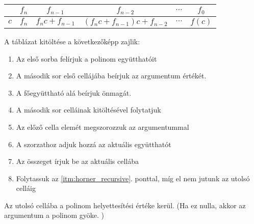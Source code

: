 \documentclass[margin=0px]{article}
\begin{document}
\begin{center}
    \begin{tabular}{|c|c|c|c|c|c|}
        \hline     & $f_n$ & $f_{n-1}$      & $f_{n-2}$                 & $\cdots$ & $f_0$  \\
        \hline $c$ & $f_n$ & $f_nc+f_{n-1}$ & $(f_nc+f_{n-1})c+f_{n-2}$ & $\cdots$ & $f(c)$ \\
        \hline
    \end{tabular}
\end{center}
A táblázat kitöltése a következőképp zajlik:
\begin{enumerate}
    \item Az első sorba felírjuk a polinom együtthatóit
    \item A második sor első cellájába beírjuk az argumentum értékét.
    \item A főegyüttható alá beírjuk önmagát.
    \item A második sor celláinak kitöltésével folytatjuk
    \item \label{itm:horner_recursive} Az előző cella elemét megszorozzuk az argumentummal
    \item A szorzathoz adjuk hozzá az aktuális együtthatót
    \item Az összeget írjuk be az aktuális cellába
    \item Folytassuk az \ref{itm:horner_recursive}. ponttal, míg el nem jutunk az utolsó celláig
\end{enumerate}

\noindent
Az utolsó cellába a polinom helyettesítési értéke kerül. (Ha ez nulla, akkor az argumentum a polinom gyöke. )
\end{document}
